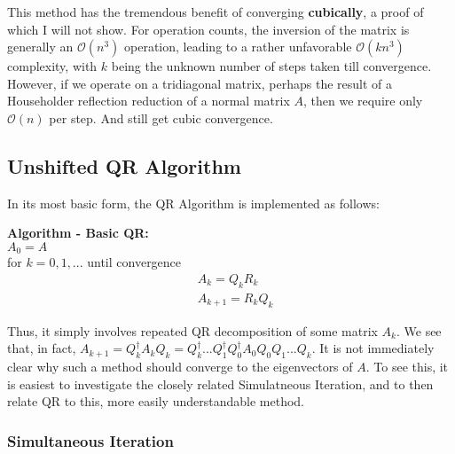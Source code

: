 \documentclass[11pt]{article}
\begin{document}
This method has the tremendous benefit of converging \textbf{cubically}, a proof of which I will not show. For operation counts, the inversion of the matrix is generally an $\mathcal{O}(n^3)$ operation, leading to a rather unfavorable $\mathcal{O}(kn^3)$ complexity, with $k$ being the unknown number of steps taken till convergence. However, if we operate on a tridiagonal matrix, perhaps the result of a Householder reflection reduction of a normal matrix $A$, then we require only $\mathcal{O}(n)$ per step. And still get cubic convergence.

\subsection{Unshifted QR Algorithm}

In its most basic form, the QR Algorithm is implemented as follows:

\begin{framed}
\textbf{Algorithm - Basic QR:} \\
\hspace{5mm} $A_0 = A$ \\
\hspace{5mm} for $k=0,1,...$ until convergence \\
\begin{align*}
  &A_k = Q_k R_k \\
  &A_{k+1} = R_k Q_k
\end{align*}
\end{framed}

Thus, it simply involves repeated QR decomposition of some matrix $A_k$. We see that, in fact, $A_{k+1} = Q^\dagger_k A_k Q_k = Q^\dagger_k...Q^\dagger_1Q^\dagger_0 A_0 Q_0Q_1...Q_k$. It is not immediately clear why such a method should converge to the eigenvectors of $A$. To see this, it is easiest to investigate the closely related Simulatneous Iteration, and to then relate QR to this, more easily understandable method. 

\subsubsection{Simultaneous Iteration}
\end{document}
